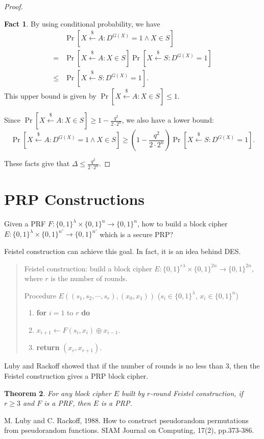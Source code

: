 \documentclass[12pt]{article}
\newcommand{\bits}{\{0,1\}}
\newcommand{\getsr}{\stackrel{\$}{\gets}}
\newcommand{\tab}{\hspace{0.3in}}
\newtheorem{theorem}{Theorem}[section]
\theoremstyle{definition}
\newtheorem{fact}[theorem]{Fact}
\begin{document}
\begin{proof}
\begin{fact}
By using conditional probability, we have
$$\begin{aligned}
& \Pr[X \getsr A : D^{G(X)}=1 \wedge X \in S] \\
= & \Pr[X \getsr A : X \in S] \Pr[X \getsr S : D^{G(X)}=1] \\
\leq &\Pr[X \getsr S : D^{G(X)}=1].
\end{aligned}$$
This upper bound is given by $\Pr[X \getsr A : X \in S] \leq 1$.

Since $\Pr[X \getsr A : X \in S] \geq 1-\frac{q^2}{2 \cdot 2^n}$, we also have a lower bound:
$$\Pr[X \getsr A : D^{G(X)}=1 \wedge X \in S] \geq (1-\frac{q^2}{2 \cdot 2^n})\Pr[X \getsr S : D^{G(X)}=1].$$
\end{fact}
These facts give that $\Delta \leq \frac{q^2}{2 \cdot 2^n}$.
\end{proof}

\section{PRP Constructions}
Given a PRF $F : \bits^\lambda \times \bits^n \to \bits^n$, how to build a block cipher $E : \bits^\lambda \times \bits^{n'} \to \bits^{n'}$ which is a secure PRP?

Feistel construction can achieve this goal. In fact, it is an idea behind DES.

\begin{quote}
Feistel construction: build a block cipher $E : \bits^{r\lambda} \times \bits^{2n} \to \bits^{2n}$, where $r$ is the number of rounds.

Procedure $E((s_1, s_2, \cdots, s_r), (x_0, x_1))$ ($s_i\in\bits^\lambda$, $x_i\in\bits^n$)
\begin{enumerate}
\item {\bf for} $i=1$ to $r$ {\bf do}
\item \tab $x_{i+1} \gets F(s_i, x_i) \oplus x_{i-1}$.
\item {\bf return} $(x_r, x_{r+1})$.
\end{enumerate}
\end{quote}

Luby and Rackoff \cite{LR88} showed that if the number of rounds is no less than 3, then the Feistel construction gives a PRP block cipher.
\begin{theorem}
For any block cipher $E$ built by $r$-round Feistel construction, if $r\geq 3$ and $F$ is a PRF, then $E$ is a PRP.
\end{theorem}

\begin{thebibliography}{10}

M. Luby and C. Rackoff, 1988. 
How to construct pseudorandom permutations from pseudorandom functions. 
SIAM Journal on Computing, 17(2), pp.373-386.

\end{thebibliography}
\end{document}
